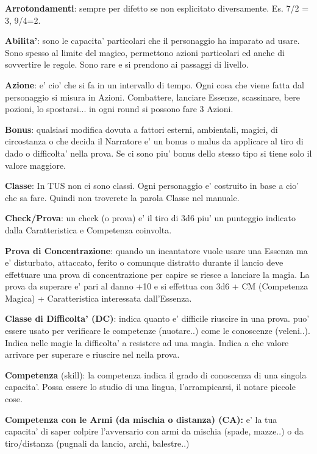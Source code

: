 \documentclass[a4paper,11pt,twoside,openany]{dndbook}
\begin{document}
\textbf{Arrotondamenti}: sempre per difetto se non esplicitato diversamente. Es. 7/2 = 3, 9/4=2.

\textbf{Abilita'}: sono le capacita' particolari che il personaggio ha imparato ad usare. Sono spesso al limite del magico, permettono azioni particolari ed anche di sovvertire le regole. Sono rare e si prendono ai passaggi di livello.

\textbf{Azione}: e' cio' che si fa in un intervallo di tempo. Ogni cosa che viene fatta dal personaggio si misura in Azioni. Combattere, lanciare Essenze, scassinare, bere pozioni, lo spostarsi... in ogni round si possono fare 3 Azioni.

\textbf{Bonus}: qualsiasi modifica dovuta a fattori esterni, ambientali, magici, di circostanza o che decida il Narratore e' un bonus o malus da applicare al tiro di dado o difficolta' nella prova. Se ci sono piu' bonus dello stesso tipo si tiene solo il valore maggiore.

\textbf{Classe}: In TUS non ci sono classi. Ogni personaggio e' costruito in base a cio' che sa fare. Quindi non troverete la parola Classe nel manuale.

\textbf{Check/Prova}: un check (o prova) e' il tiro di 3d6 piu' un punteggio indicato dalla Caratteristica e Competenza coinvolta.

\textbf{Prova di Concentrazione}: quando un incantatore vuole usare una Essenza ma e' disturbato, attaccato, ferito o comunque distratto durante il lancio deve effettuare una prova di concentrazione per capire se riesce a lanciare la magia. La prova da superare e' pari al danno +10 e si effettua con 3d6 + CM (Competenza Magica) + Caratteristica interessata dall'Essenza.

\textbf{Classe di Difficolta' (DC)}: indica quanto e' difficile riuscire in una prova. puo' essere usato per verificare le competenze (nuotare..) come le conoscenze (veleni..). Indica nelle magie la difficolta' a resistere ad una magia. Indica a che valore arrivare per superare e riuscire nel nella prova.

\textbf{Competenza} (skill): la competenza indica il grado di conoscenza di una singola capacita'. Possa essere lo studio di una lingua, l'arrampicarsi, il notare piccole cose.

\textbf{Competenza con le Armi (da mischia o distanza) (CA):} e' la tua capacita' di saper colpire l'avversario con armi da mischia (spade, mazze..) o da tiro/distanza (pugnali da lancio, archi, balestre..) 
\end{document}
